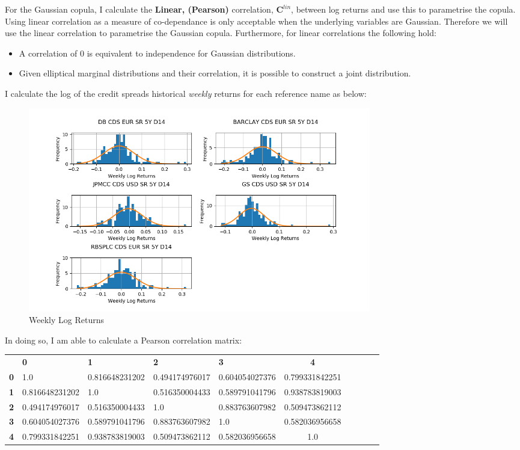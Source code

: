 \documentclass{report}
\theoremstyle{plain}
\theoremstyle{definition}
\begin{document}
For the Gaussian copula, I calculate the \textbf{Linear, (Pearson)} correlation, $\mathbf{C}^{lin}$, between log returns and use this to parametrise the copula. Using linear correlation as a measure of co-dependance is only acceptable when the underlying variables are Gaussian. Therefore we will use the linear correlation to parametrise the Gaussian copula. Furthermore, for linear correlations the following hold:

\begin{itemize}
	\item A correlation of 0 is equivalent to independence for Gaussian distributions.
	\item Given elliptical marginal distributions and their correlation, it is possible to construct a joint distribution.
\end{itemize}

I calculate the log of the credit spreads historical \emph{weekly} returns for each reference name as below:

\begin{figure}[H]
	\begin{center}
		\includegraphics[width=15cm]{Weekly_log_returns.png}
		\caption{Weekly Log Returns} 
		\label{Weekly_log_returns}
	\end{center}
\end{figure}

In doing so, I am able to calculate a Pearson correlation matrix: 

\begin{center}
	\begin{tabular}{|l|l|l|l|l|c|c|c|c|c|}
		\hline
		& \textbf{0} & \textbf{1} & \textbf{2} & \textbf{3} & \textbf{4}\\\hhline{|=|=|=|=|=|=|}
		\textbf{0} & 1.0 & 0.816648231202 & 0.494174976017 & 0.604054027376 & 0.799331842251\\
		\textbf{1} & 0.816648231202 & 1.0 & 0.516350004433 & 0.589791041796 & 0.938783819003\\
		\textbf{2} & 0.494174976017 & 0.516350004433 & 1.0 & 0.883763607982 & 0.509473862112\\
		\textbf{3} & 0.604054027376 & 0.589791041796 & 0.883763607982 & 1.0 & 0.582036956658\\
		\textbf{4} & 0.799331842251 & 0.938783819003 & 0.509473862112 & 0.582036956658 & 1.0\\
		\hline
	\end{tabular}
\end{center}
\end{document}
